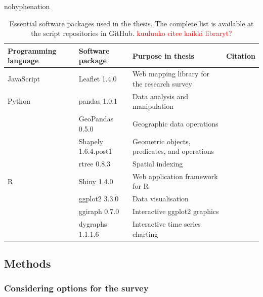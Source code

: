 \begin{hyphenrules}{nohyphenation}
    \begin{table}[H]
        \centering
        \caption[Essential software packages in thesis]{Essential software packages used in the thesis. The complete list is available at the script repositories in GitHub. \textcolor{red}{kuuluuko citee kaikki libraryt?}} 
        \label{tab:used_soft}
        \def\arraystretch{1.2}
        \setlength\tabcolsep{1.2ex}
        \begin{tabular}{ @{} >{\raggedright\arraybackslash}p{2.5cm} >{\raggedright\arraybackslash}p{3cm} >{\raggedright\arraybackslash}p{4cm} >{\raggedleft\arraybackslash}p{3cm} @{} }
            \toprule
            Programming language & Software package & Purpose in thesis & Citation \\
            \midrule
            JavaScript & Leaflet 1.4.0 & Web mapping library for the research survey & \cite{Agafonkin2019} \\
            Python & pandas 1.0.1 & Data analysis and manipulation & \cite{McKinney2011a} \\
                & GeoPandas 0.5.0 & Geographic data operations & \cite{GeoPandasDevelopers2019} \\
                & Shapely 1.6.4.post1 & Geometric objects, predicates, and operations & \cite{Gillies2019} \\
                & rtree 0.8.3 & Spatial indexing & \cite{Gillies2014} \\
            R & Shiny 1.4.0 & Web application framework for R & \cite{Chang2019} \\
                & ggplot2 3.3.0 & Data visualisation & \cite{Wickham2016} \\
                & ggiraph 0.7.0 & Interactive ggplot2 graphics & \cite{Gohel2019} \\
                & dygraphs 1.1.1.6 & Interactive time series charting & \cite{Vanderkam2018} \\
            \bottomrule
        \end{tabular}
    \end{table} 
\end{hyphenrules}

\subsection{Methods}
\subsubsection{Considering options for the survey}
\justify


